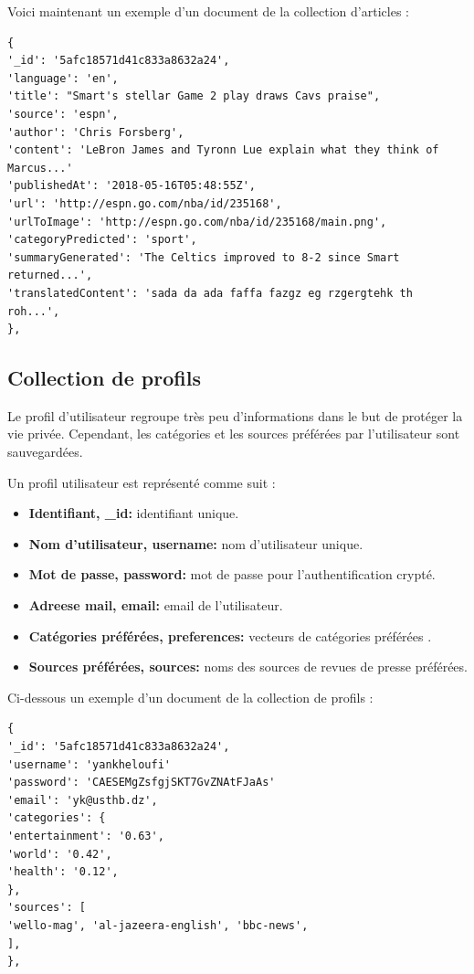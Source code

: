 Voici maintenant un exemple d'un document de la collection d'articles :
\begin{lstlisting}[style=code]
{
'_id': '5afc18571d41c833a8632a24', 
'language': 'en',
'title': "Smart's stellar Game 2 play draws Cavs praise", 
'source': 'espn', 
'author': 'Chris Forsberg', 
'content': 'LeBron James and Tyronn Lue explain what they think of Marcus...'
'publishedAt': '2018-05-16T05:48:55Z', 
'url': 'http://espn.go.com/nba/id/235168',
'urlToImage': 'http://espn.go.com/nba/id/235168/main.png',  
'categoryPredicted': 'sport', 
'summaryGenerated': 'The Celtics improved to 8-2 since Smart returned...', 
'translatedContent': 'sada da ada faffa fazgz eg rzgergtehk th roh...', 
},
\end{lstlisting}

\subsection{Collection de profils}
Le profil d'utilisateur regroupe très peu d'informations dans le but de protéger la vie privée. Cependant, les catégories et les sources préférées par l'utilisateur sont sauvegardées. 

Un profil utilisateur est représenté comme suit :
\begin{itemize}
    \item \textbf{Identifiant, \textquotedbl  \_id\textquotedbl : } identifiant unique.
    \item \textbf{Nom d'utilisateur, \textquotedbl  username\textquotedbl : } nom d'utilisateur unique.
    \item \textbf{Mot de passe, \textquotedbl  password\textquotedbl : } mot de passe pour l'authentification crypté.
    \item \textbf{Adreese mail, \textquotedbl  email\textquotedbl : } email de l'utilisateur.
    \item \textbf{Catégories préférées, \textquotedbl  preferences\textquotedbl : } vecteurs de catégories préférées .
    \item \textbf{Sources préférées, \textquotedbl  sources\textquotedbl : } noms des sources de revues de presse préférées. 
\end{itemize}

Ci-dessous un exemple d'un document de la collection de profils :
\begin{lstlisting}[style=code]
{
'_id': '5afc18571d41c833a8632a24', 
'username': 'yankheloufi'
'password': 'CAESEMgZsfgjSKT7GvZNAtFJaAs'
'email': 'yk@usthb.dz',
'categories': {
'entertainment': '0.63',
'world': '0.42',
'health': '0.12',
},
'sources': [
'wello-mag', 'al-jazeera-english', 'bbc-news', 
],
},
\end{lstlisting}


